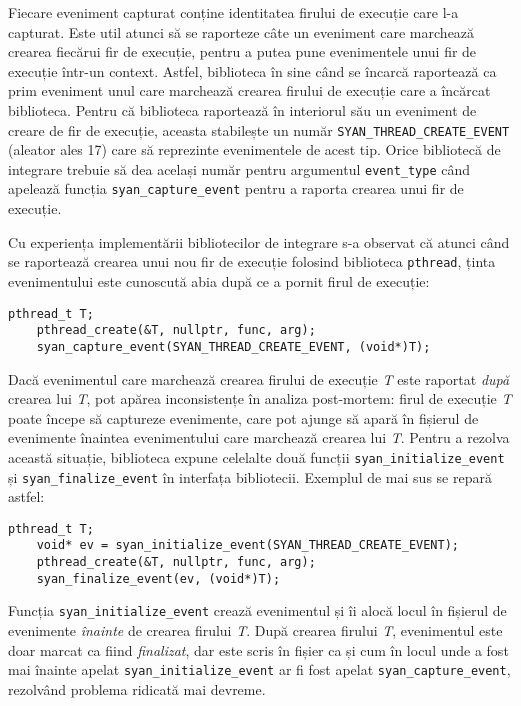 Fiecare eveniment capturat conține identitatea firului de execuție care
l-a capturat. Este util atunci să se raporteze câte un eveniment care
marchează crearea fiecărui fir de execuție, pentru a putea pune
evenimentele unui fir de execuție într-un context. Astfel, biblioteca în
sine când se încarcă raportează ca prim eveniment unul care marchează
crearea firului de execuție care a încărcat biblioteca. Pentru că
biblioteca raportează în interiorul său un eveniment de creare de fir de
execuție, aceasta stabilește un număr
\lstinline{SYAN_THREAD_CREATE_EVENT} (aleator ales 17) care să
reprezinte evenimentele de acest tip. Orice bibliotecă de integrare
trebuie să dea același număr pentru argumentul \lstinline{event_type}
când apelează funcția \lstinline{syan_capture_event} pentru a raporta
crearea unui fir de execuție.

Cu experiența implementării bibliotecilor de integrare s-a observat că
atunci când se raportează crearea unui nou fir de execuție folosind
biblioteca \lstinline{pthread}, ținta evenimentului este cunoscută abia
după ce a pornit firul de execuție:
\begin{lstlisting}[caption=Exemplul 2 folosit în proiectarea interfeței]
    pthread_t T;
    pthread_create(&T, nullptr, func, arg);
    syan_capture_event(SYAN_THREAD_CREATE_EVENT, (void*)T);
\end{lstlisting}
Dacă evenimentul care marchează crearea firului de execuție \textit{T}
este raportat \textit{după} crearea lui \textit{T}, pot apărea
inconsistențe în analiza post-mortem: firul de execuție \textit{T} poate
începe să captureze evenimente, care pot ajunge să apară în fișierul de
evenimente înaintea evenimentului care marchează crearea lui \textit{T}.
Pentru a rezolva această situație, biblioteca expune celelalte două
funcții \lstinline{syan_initialize_event} și
\lstinline{syan_finalize_event} în interfața bibliotecii. Exemplul de
mai sus se repară astfel:
\begin{lstlisting}[caption=Exemplul 3 folosit în proiectarea interfeței]
    pthread_t T;
    void* ev = syan_initialize_event(SYAN_THREAD_CREATE_EVENT);
    pthread_create(&T, nullptr, func, arg);
    syan_finalize_event(ev, (void*)T);
\end{lstlisting}
Funcția \lstinline{syan_initialize_event} crează evenimentul și îi
alocă locul în fișierul de evenimente \textit{înainte} de crearea
firului \textit{T}. După crearea firului \textit{T}, evenimentul este
doar marcat ca fiind \textit{finalizat}, dar este scris în fișier ca și
cum în locul unde a fost mai înainte apelat
\lstinline{syan_initialize_event} ar fi fost apelat
\lstinline{syan_capture_event}, rezolvând problema ridicată mai devreme.

